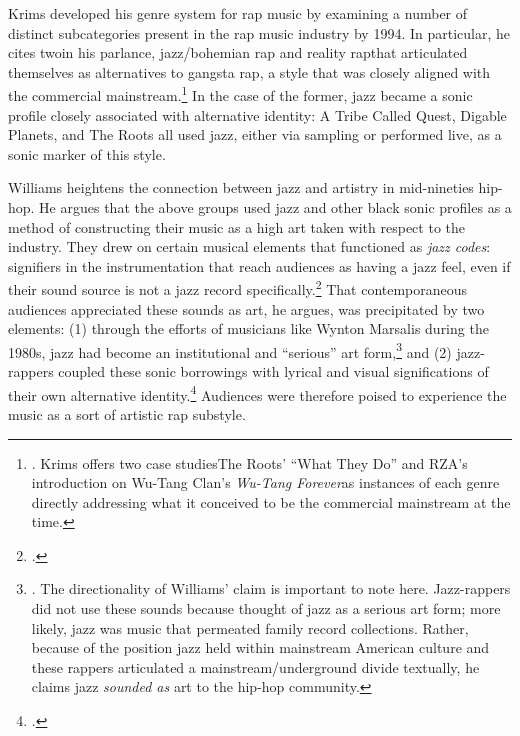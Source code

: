 Krims developed his genre system for rap music by examining a number of distinct subcategories present
in the rap music industry by 1994. In particular, he cites two\textemdash in his parlance, jazz/bohemian
rap and reality rap\textemdash that articulated themselves as alternatives to gangsta rap, a style that 
was closely aligned with the commercial mainstream.\footnote{
    \autocite[64--65]{adamkrimsRapMusicPoetics2000}. Krims offers two case studies\textemdash The Roots' 
    ``What They Do'' and RZA's introduction on Wu-Tang Clan's \textit{Wu-Tang Forever}\textemdash as 
    instances of each genre directly addressing what it conceived to be the commercial mainstream at
    the time.}
In the case of the former, jazz became a sonic profile closely associated with alternative identity:
A Tribe Called Quest, Digable Planets, and The Roots all used jazz, either via sampling or performed
live, as a sonic marker of this style.

Williams heightens the connection between jazz and artistry in mid-nineties hip-hop. He argues that 
the above groups used jazz and other black sonic profiles as a method of constructing their music as
a high art taken with respect to the industry. They drew on certain musical elements that functioned
as \emph{jazz codes}: signifiers in the instrumentation that reach audiences as having a jazz feel,
even if their sound source is not a jazz record specifically.\footnote{
    \autocite[55]{justinawilliamsRhyminStealinMusical2013}.}
That contemporaneous audiences appreciated these sounds as art, he argues, was precipitated by two 
elements: (1) through the efforts of musicians like Wynton Marsalis during the 1980s, jazz had become
an institutional and  ``serious'' art form,\footnote{
    \autocite[48--52]{justinawilliamsRhyminStealinMusical2013}. The directionality of Williams' claim 
    is important to note here. Jazz-rappers did not use these sounds because thought of jazz as a serious
    art form; more likely, jazz was music that permeated family record collections. Rather, because of 
    the position jazz held within mainstream American culture and these rappers articulated a 
    mainstream/underground divide textually, he claims jazz \emph{sounded as} art to the hip-hop 
    community.} 
and (2) jazz-rappers coupled these sonic borrowings with lyrical and visual significations of their 
own alternative identity.\footnote{
    \autocite[55--64]{justinawilliamsRhyminStealinMusical2013}.}
Audiences were therefore poised to experience the music as a sort of artistic rap substyle.

